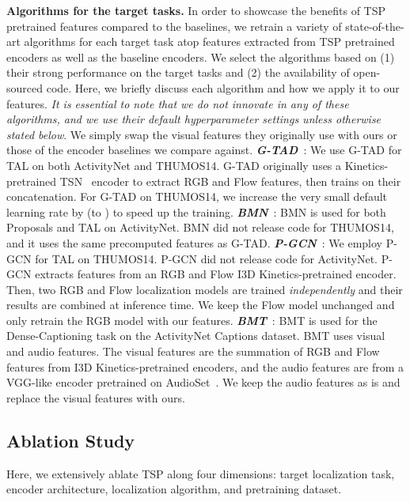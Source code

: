 \documentclass[10pt,twocolumn,letterpaper]{article}
\begin{document}
\vspace{3pt}\noindent\textbf{Algorithms for the target tasks.}
In order to showcase the benefits of TSP pretrained features compared to the baselines, we retrain a variety of state-of-the-art algorithms for each target task atop features extracted from TSP pretrained encoders as well as the baseline encoders. We select the algorithms based on (1) their strong performance on the target tasks and (2) the availability of open-sourced code. Here, we briefly discuss each algorithm and how we apply it to our features. \emph{It is essential to note that we do not innovate in any of these algorithms, and we use their default hyperparameter settings unless otherwise stated below}. We simply swap the visual features they originally use with ours or those of the encoder baselines we compare against. 
\textbf{\textit{G-TAD}}~\cite{xu2020gtad}: 
We use G-TAD for TAL on both ActivityNet and THUMOS14. G-TAD originally uses a Kinetics-pretrained TSN~\cite{tsn} encoder to extract RGB and Flow features, then trains on their concatenation. For G-TAD on THUMOS14, we increase the very small default learning rate by  (\ie to ) to speed up the training.
\textbf{\textit{BMN}}~\cite{Lin_2019_ICCV}:
BMN is used for both Proposals and TAL on ActivityNet. BMN did not release code for THUMOS14, and it uses the same precomputed features as G-TAD.
\textbf{\textit{P-GCN}}~\cite{Zeng_2019_ICCV}:
We employ P-GCN for TAL on THUMOS14. P-GCN did not release code for ActivityNet. P-GCN extracts features from an RGB and Flow I3D Kinetics-pretrained encoder. Then, two RGB and Flow localization models are trained \textit{independently} and their results are combined at inference time. We keep the Flow model unchanged and only retrain the RGB model with our features.
\textbf{\textit{BMT}}~\cite{bmt}:
BMT is used for the Dense-Captioning task on the ActivityNet Captions dataset. BMT uses visual and audio features. The visual features are the summation of RGB and Flow features from I3D Kinetics-pretrained encoders, and the audio features are from a VGG-like encoder pretrained on AudioSet~\cite{dataset_audioset}. We keep the audio features as is and replace the visual features with ours.



\subsection{Ablation Study}
Here, we extensively ablate TSP along four dimensions: target localization task, encoder architecture, localization algorithm, and pretraining dataset.
\end{document}
